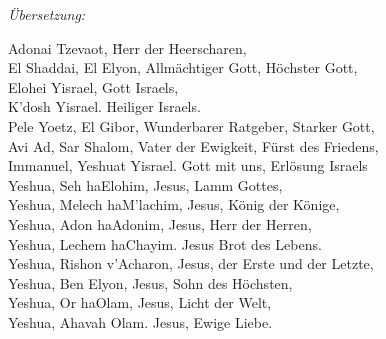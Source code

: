 \textit{Übersetzung:}\\
\begin{tabbing}
Adonai Tzevaot, \hspace{60px} \= Herr der Heerscharen,\\
El Shaddai, El Elyon, \> Allmächtiger Gott, Höchster Gott,\\
Elohei Yisrael, \> Gott Israels,\\
K'dosh Yisrael. \> Heiliger Israels.\\
Pele Yoetz, El Gibor, \> Wunderbarer Ratgeber, Starker Gott,\\
Avi Ad, Sar Shalom, \> Vater der Ewigkeit, Fürst des Friedens,\\
Immanuel, Yeshuat Yisrael. \> Gott mit uns, Erlösung Israels\\
Yeshua, Seh haElohim, \> Jesus, Lamm Gottes,\\
Yeshua, Melech haM'lachim, \> Jesus, König der Könige,\\
Yeshua, Adon haAdonim, \> Jesus, Herr der Herren,\\
Yeshua, Lechem haChayim. \> Jesus Brot des Lebens.\\
Yeshua, Rishon v'Acharon, \> Jesus, der Erste und der Letzte,\\
Yeshua, Ben Elyon, \> Jesus, Sohn des Höchsten,\\
Yeshua, Or haOlam, \> Jesus, Licht der Welt,\\
Yeshua, Ahavah Olam. \> Jesus, Ewige Liebe.\\
\end{tabbing}